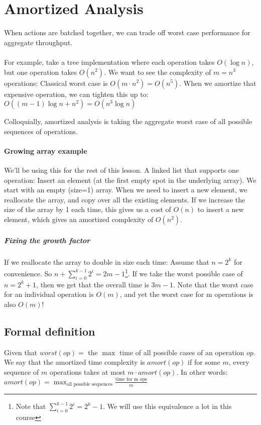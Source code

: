 \documentclass[a4paper]{article}
\begin{document}
\section{Amortized Analysis}

When actions are batched together, we can trade off worst case performance for aggregate throughput.

\paragraph{}
For example, take a tree implementation where each operation takes $O(\log n)$, but one operation takes $O(n^2)$.
We want to see the complexity of $m=n^3$ operations: Classical worst case is $O(m\cdot n^2)= O(n^5)$. When we amortize that expensive operation, we can tighten this up to: $O((m-1)\log n + n^2)=O(n^3\log n)$

Colloquially, amortized analysis is taking the aggregate worst case of all possible sequences of operations.

\paragraph{Growing array example}
We'll be using this for the rest of this lesson. A linked list that supports one operation: Insert an element (at the first empty spot in the underlying array). We start with an empty (size=1) array. When we need to insert a new element, we reallocate the array, and copy over all the existing elements. If we increase the size of the array by 1 each time, this gives us a cost of $O(n)$ to insert a new element, which gives an amortized complexity of $O(n^2)$.

\subparagraph{Fixing the growth factor}
If we reallocate the array to double in size each time: Assume that $n=2^k$ for convenience. So $n+\sum\limits_{i=0}^{k-1}2^i=2m-1$\footnote{Note that $\sum\limits_{i=0}^{k-1}2^i=2^k-1$. We will use this equivalence a lot in this course}. If we take the worst possible case of $n=2^k+1$, then we get that the overall time is $3m-1$. Note that the worst case for an individual operation is $O(m)$, and yet the worst case for m operations is also $O(m)$!

\subsection{Formal definition}
Given that $worst(op)=$ the $\max$ time of all possible cases of an operation $op$. We say that the amortized time complexity is $amort(op)$ if for some $m$, every sequence of $m$ operations takes at most $m\cdot amort(op)$. In other words: $amort(op)=\max_\text{all possible sequences}\frac{\text{time for m ops}}{m}$
\end{document}
